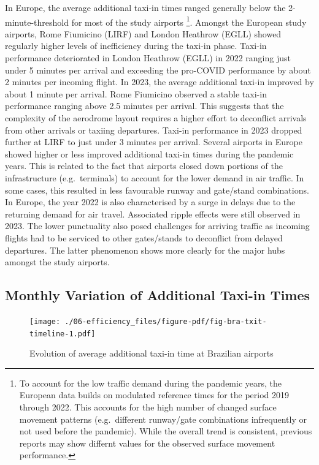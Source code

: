 \documentclass[
  a4paper,
  DIV=11,
  numbers=noendperiod]{scrreport}
\begin{document}
In Europe, the average additional taxi-in times ranged generally below
the 2-minute-threshold for most of the study airports \footnote{To
  account for the low traffic demand during the pandemic years, the
  European data builds on modulated reference times for the period 2019
  through 2022. This accounts for the high number of changed surface
  movement patterns (e.g.~different runway/gate combinations
  infrequently or not used before the pandemic). While the overall trend
  is consistent, previous reports may show differnt values for the
  observed surface movement performance.}. Amongst the European study
airports, Rome Fiumicino (LIRF) and London Heathrow (EGLL) showed
regularly higher levels of inefficiency during the taxi-in phase.
Taxi-in performance deteriorated in London Heathrow (EGLL) in 2022
ranging just under 5 minutes per arrival and exceeding the pro-COVID
performance by about 2 minutes per incoming flight. In 2023, the average
additional taxi-in improved by about 1 minute per arrival. Rome
Fiumicino observed a stable taxi-in performance ranging above 2.5
minutes per arrival. This suggests that the complexity of the aerodrome
layout requires a higher effort to deconflict arrivals from other
arrivals or taxiing departures. Taxi-in performance in 2023 dropped
further at LIRF to just under 3 minutes per arrival. Several airports in
Europe showed higher or less improved additional taxi-in times during
the pandemic years. This is related to the fact that airports closed
down portions of the infrastructure (e.g.~terminals) to account for the
lower demand in air traffic. In some cases, this resulted in less
favourable runway and gate/stand combinations. In Europe, the year 2022
is also characterised by a surge in delays due to the returning demand
for air travel. Associated ripple effects were still observed in 2023.
The lower punctuality also posed challenges for arriving traffic as
incoming flights had to be serviced to other gates/stands to deconflict
from delayed departures. The latter phenomenon shows more clearly for
the major hubs amongst the study airports.

\hypertarget{monthly-variation-of-additional-taxi-in-times}{%
\subsection{Monthly Variation of Additional Taxi-in
Times}\label{monthly-variation-of-additional-taxi-in-times}}

\begin{figure}[H]

{\centering \texttt{[image: ./06-efficiency\_files/figure-pdf/fig-bra-txit-timeline-1.pdf]}

}

\caption{\label{fig-bra-txit-timeline}Evolution of average additional
taxi-in time at Brazilian airports}

\end{figure}
\end{document}
